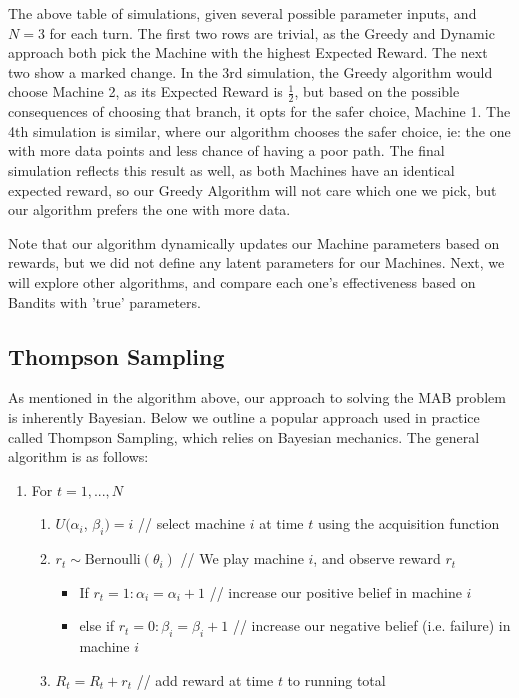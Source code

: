 \documentclass{article}
\begin{document}
The above table of simulations, given several possible parameter inputs, and $N=3$ for each turn. The first two rows are trivial, as the Greedy and Dynamic approach both pick the Machine with the highest Expected Reward. The next two show a marked change. In the 3rd simulation, the Greedy algorithm would choose Machine 2, as its Expected Reward is $\frac{1}{2}$, but based on the possible consequences of choosing that branch, it opts for the safer choice, Machine 1. The 4th simulation is similar, where our algorithm chooses the safer choice, ie: the one with more data points and less chance of having a poor path. The final simulation reflects this result as well, as both Machines have an identical expected reward, so our Greedy Algorithm will not care which one we pick, but our algorithm prefers the one with more data.

Note that our algorithm dynamically updates our Machine parameters based on rewards, but we did not define any latent parameters for our Machines. Next, we will explore other algorithms, and compare each one's effectiveness based on Bandits with 'true' parameters.

\subsection{Thompson Sampling}

As mentioned in the algorithm above, our approach to solving the MAB problem is inherently Bayesian. Below we outline a popular approach used in practice called Thompson Sampling, which relies on Bayesian mechanics. The general algorithm is as follows:

\begin{enumerate}
\item For $t = 1, ..., N$
	\begin{enumerate}
	\item $U(\alpha_i$, $\beta_i) = i$  // select machine $i$ at time $t$ using the acquisition function
	\item $r_t \sim \text{Bernoulli}(\theta_{i})$   // We play machine $i$, and observe reward $r_t$
	\begin{itemize}
		\item If $r_t = 1: \alpha_i = \alpha_i + 1$   // increase our positive belief in machine $i$
		\item else if $r_t = 0: \beta_i = \beta_i + 1$  // increase our negative belief (i.e. failure) in machine $i$
	\end{itemize}
	\item $R_t = R_t + r_t$		// add reward at time $t$ to running total
	\end{enumerate}
\end{enumerate}
\end{document}
